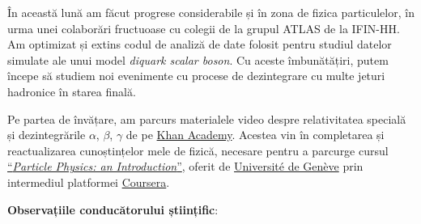 În această lună am făcut progrese considerabile și în zona de fizica particulelor, în urma unei colaborări fructuoase cu colegii de la grupul ATLAS de la IFIN-HH. Am optimizat și extins codul de analiză de date folosit pentru studiul datelor simulate ale unui model \emph{diquark scalar boson}. Cu aceste îmbunătățiri, putem începe să studiem noi evenimente cu procese de dezintegrare cu multe jeturi hadronice în starea finală.

Pe partea de învățare, am parcurs materialele video despre relativitatea specială și dezintegrările \(\alpha\), \(\beta\), \(\gamma\) de pe \href{https://www.khanacademy.org/}{Khan Academy}. Acestea vin în completarea și reactualizarea cunoștințelor mele de fizică, necesare pentru a parcurge cursul \href{https://www.coursera.org/learn/particle-physics}{``\textit{Particle Physics: an Introduction}''}, oferit de \href{https://www.unige.ch/}{Université de Genève} prin intermediul platformei \href{https://www.coursera.org/}{Coursera}.

\textbf{Observațiile conducătorului științific}:

